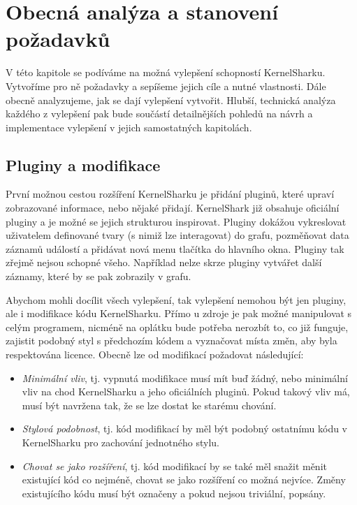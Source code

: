 \chapter{Obecná analýza a stanovení požadavků}
V této kapitole se podíváme na možná vylepšení schopností KernelSharku. Vytvoříme pro ně požadavky a sepíšeme jejich cíle a nutné vlastnosti. Dále obecně analyzujeme, jak se dají vylepšení vytvořit. Hlubší, technická analýza každého z vylepšení pak bude součástí detailnějších pohledů na návrh a implementace vylepšení v jejich samostatných kapitolách. 

\section{Pluginy a modifikace}
První možnou cestou rozšíření KernelSharku je přidání pluginů, které upraví zobrazované informace, nebo nějaké přidají. KernelShark již obsahuje oficiální pluginy a je možné se jejich strukturou inspirovat. Pluginy dokážou vykreslovat uživatelem definované tvary (s nimiž lze interagovat) do grafu, pozměňovat data záznamů událostí a přidávat nová menu tlačítka do hlavního okna. Pluginy tak zřejmě nejsou schopné všeho. Například nelze skrze pluginy vytvářet další záznamy, které by se pak zobrazily v grafu.

Abychom mohli docílit všech vylepšení, tak vylepšení nemohou být jen pluginy, ale i modifikace kódu KernelSharku. Přímo u zdroje je pak možné manipulovat s celým programem, nicméně na oplátku bude potřeba nerozbít to, co již funguje, zajistit podobný styl s předchozím kódem a vyznačovat místa změn, aby byla respektována licence. Obecně lze od modifikací požadovat následující:
\begin{itemize}
    \item \emph{Minimální vliv}, tj. vypnutá modifikace musí mít buď žádný, nebo minimální vliv na chod KernelSharku a jeho oficiálních pluginů. Pokud takový vliv má, musí být navržena tak, že se lze dostat ke starému chování.
    \item \emph{Stylová podobnost}, tj. kód modifikací by měl být podobný ostatnímu kódu v KernelSharku pro zachování jednotného stylu.
    \item \emph{Chovat se jako rozšíření}, tj. kód modifikací by se také měl snažit měnit existující kód co nejméně, chovat se jako rozšíření co možná nejvíce. Změny existujícího kódu musí být označeny a pokud nejsou triviální, popsány.
\end{itemize}

